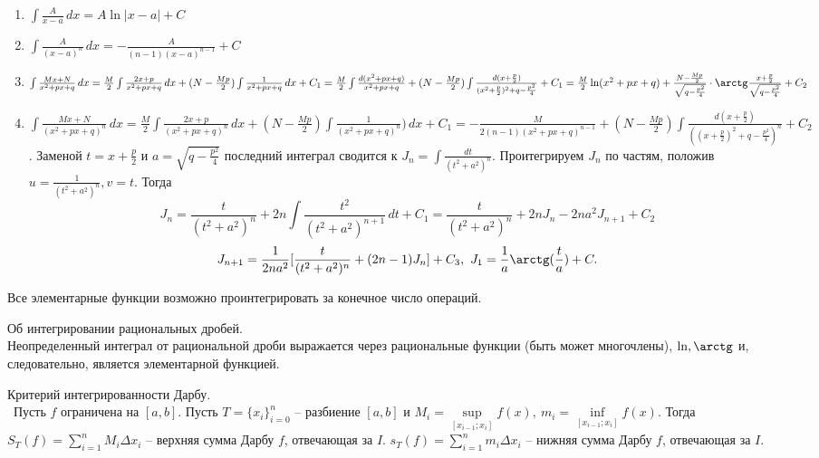 \begin{theorem}
    \begin{enumerate}
        \item $\int \frac{A}{x-a} \,dx = A \ln|x-a| + C$
        \item $\int \frac{A}{(x-a)^{n}} \,dx = - \frac{A}{(n-1)(x-a)^{n-1}} + C$
        \item $\int \frac{Mx+N}{x^2 + px + q} \, dx = \frac{M}{2} \int \frac{2x + p}{x^2 + px + q} \,dx + (N-\frac{Mp}{2})\int \frac{1}{x^2 + px + q} \,dx + C_{1} = \\ \frac{M}{2}\int \frac{d(x^2 + px + q)}{x^2 + px + q} + (N - \frac{Mp}{2})\int \frac{d(x + \frac{p}{2})}{(x^2 + \frac{p}{2})^2 + q - \frac{p^2}{4}} + C_{1} = \frac{M}{2}\ln(x^2 + px + q) + \frac{N - \frac{Mp}{2}}{\sqrt{q - \frac{p^2}{4}}}\cdot \arctg \frac{x + \frac{p}{2}}{\sqrt{q - \frac{p^2}{4}}} + C_{2}$
        \item $\int \frac{Mx + N}{(x^2 + px + q)^{n}} \, dx = \frac{M}{2} \int \frac{2x+p}{(x^2 + px + q)^{n}} \, dx + (N - \frac{Mp}{2}) \int \frac{1}{(x^2 + px + q)^{n}}) \, dx + C_{1} = - \frac{M}{2(n-1)(x^2 + px + q)^{n-1}} + (N - \frac{Mp}{2}) \int \frac{d(x + \frac{p}{2})}{((x + \frac{p}{2})^{2} + q - \frac{p^2}{4})^{n}} + C_{2}$. Заменой $t = x + \frac{p}{2}$ и $a = \sqrt{q - \frac{p^2}{4}}$ последний интеграл сводится к $J_{n} = \int \frac{dt}{(t^2 + a^2)^{n}}$. Проитегрируем $J_{n}$ по частям, положив $u = \frac{1}{(t^2 + a^2)^{n}}, v = t$.
        Тогда 
        \[J_{n} = \frac{t}{(t^2 + a^2)^{n}} + 2n \int \frac{t^2}{(t^2 + a^2)^{n+1}} \, dt + C_{1} = \frac{t}{(t^2 + a^2)^{n}} + 2n J_{n} - 2n a^2 J_{n+1} + C_{2}\]
        \[J_{n+1} = \frac{1}{2n a^2} [\frac{t}{(t^2+a^2)^{n}} + (2n-1)J_{n}] + C_{3}, \ J_{1} = \frac{1}{a} \arctg(\frac{t}{a}) + C.\]
    \end{enumerate}
\end{theorem}

Все элементарные функции возможно проинтегрировать за конечное число операций.

\begin{theorem}
    Об интегрировании рациональных дробей.\\
    Неопределенный интеграл от рациональной дроби выражается через рациональные функции (быть может многочлены), $\ln, \arctg$ и, следовательно, является элементарной функцией.
\end{theorem}

\begin{definition}
    Критерий интегрированности Дарбу.\\\
    Пусть $f$ ограничена на $[a, b]$. Пусть $T = \{x_{i}\}_{i = 0}^{n}$ -- разбиение $[a,b]$ и $M_{i} = \underset{[x_{i-1}; x_{i}]}{\sup} f(x), \ m_{i} =  \underset{[x_{i-1}; x_{i}]}{\inf} f(x)$. Тогда
    $S_{T}(f) = \sum_{i = 1}^{n} M_{i}\Delta x_{i}$ -- верхняя сумма Дарбу $f$, отвечающая за $I$.
    $s_{T}(f) = \sum_{i = 1}^{n} m_{i}\Delta x_{i}$ -- нижняя сумма Дарбу $f$, отвечающая за $I$.
\end{definition}

